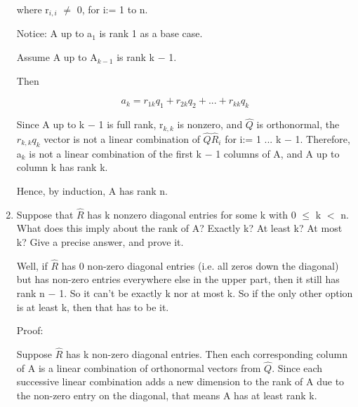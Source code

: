 \documentclass[12pt]{article}
\newcommand{\mt}[1]{\ensuremath{#1}}
\newcommand{\ms}{\mt{-} }
\newcommand{\ls}{\mt{<} }
\newcommand{\lse}{\mt{\leq} }
\newcommand{\uw}[2]{#1\mt{_{#2}}}
\begin{document}
\begin{enumerate}
where \uw{r}{i, i} $\neq$ 0, for i:= 1 to n.

Notice: A up to \uw{a}{1} is rank 1 as a base case.

Assume A up to \uw{A}{k - 1} is rank k \ms 1.

Then

\begin{displaymath}
  a_k = r_{1k}q_1 + r_{2k}q_2 + ... + r_{kk}q_k
\end{displaymath}

Since A up to k \ms 1 is full rank, \uw{r}{k, k} is nonzero, and $\hat Q$ is orthonormal, the $r_{k, k}q_k$ vector is not a linear combination of $\hat Q \hat R_i$ for i:= 1 ... k \ms 1. Therefore, \uw{a}{k} is not a linear combination of the first k \ms 1 columns of A, and A up to column k has rank k.

Hence, by induction, A has rank n.

  
  \item Suppose that $\hat R$ has k nonzero diagonal entries for some k with 0 \lse k \ls n. What does this imply about the rank of A? Exactly k? At least k? At most k? Give a precise answer, and prove it.
 
 Well, if $\hat R$ has 0 non-zero diagonal entries (i.e. all zeros down the diagonal) but has non-zero entries everywhere else in the upper part, then it still has rank n \ms 1. So it can't be exactly k nor at most k. So if the only other option is at least k, then that has to be it.
 
 Proof:
 
 Suppose $\hat R$ has k non-zero diagonal entries. Then each corresponding column of A is a linear combination of orthonormal vectors from $\hat Q$. Since each successive linear combination adds a new dimension to the rank of A due to the non-zero entry on the diagonal, that means A has at least rank k. 
 
\end{enumerate}
\end{document}
